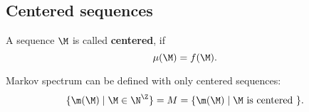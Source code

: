 \subsection{Centered sequences}

\begin{definition}
	A sequence $\M$ is called \textbf{centered}, if
	\begin{equation}\label{centered}
		\mu(\M) = f(\M).
	\end{equation}
\end{definition}

\begin{proposition}
	Markov spectrum can be defined with only centered sequences:
	\begin{equation*}
		\{ \m(\M) \mid \M \in \N^\Z \} =
		M =
		\{ \m(\M) \mid \M \text{ is centered } \}.
	\end{equation*}
\end{proposition}

